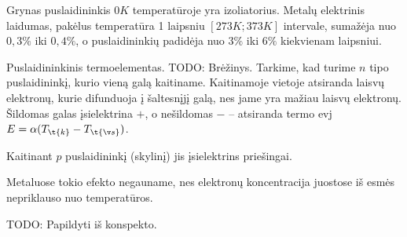 Grynas puslaidininkis $0K$ temperatūroje yra izoliatorius. Metalų
elektrinis laidumas, pakėlus temperatūra 1 laipsniu $[273K;373K]$
intervale, sumažėja nuo $0,3 \%$ iki $0,4\%$, o puslaidininkių
padidėja nuo $3\%$ iki $6\%$ kiekvienam laipsniui.

Puslaidininkinis termoelementas. TODO: Brėžinys. Tarkime, kad turime $n$
tipo puslaidininkį, kurio vieną galą kaitiname. Kaitinamoje vietoje
atsiranda laisvų elektronų, kurie difunduoja į šaltesnįjį galą, nes
jame yra mažiau laisvų elektronų. Šildomas galas įsielektrina $+$,
o nešildomas $-$ – atsiranda termo evj
$E = \alpha (T_{\t{k}} - T_{\t{š}})$.
\begin{note}
  Kaitinant $p$ puslaidininkį (skylinį) jis įsielektrins priešingai.
\end{note}
Metaluose tokio efekto negauname, nes elektronų koncentracija juostose
iš esmės nepriklauso nuo temperatūros.

TODO: Papildyti iš konspekto.
